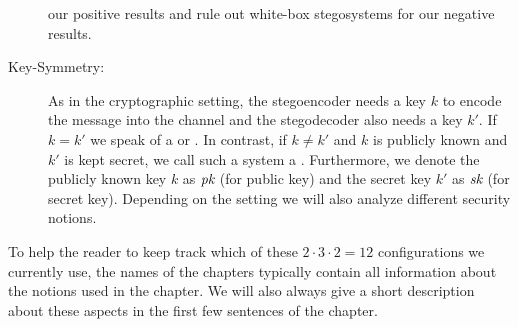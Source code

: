 \begin{description}
  our positive results and rule out white-box stegosystems for our
  negative results.
\item[Key-Symmetry:] As in the cryptographic setting, the stegoencoder
  needs a key $k$ to encode the message into the channel  and the
  stegodecoder also needs a key $k'$. If $k=k'$ we speak of a
   or . In contrast, if $k\neq k'$ and $k$ is publicly known
  and $k'$ is kept secret, we call such a system a
  . Furthermore, we denote the
  publicly known key $k$ as $\textit{pk}$ (for public key) and the secret key
  $k'$ as $\textit{sk}$ (for secret key). Depending on the setting we will also
  analyze different security notions. 
\end{description}

To help the reader to keep track which of these $2\cdot 3\cdot 2=12$
configurations we currently use, the names of the chapters typically
contain all information about the notions used in the chapter. We will
also always give a short description about these aspects in the first
few sentences of the chapter.

